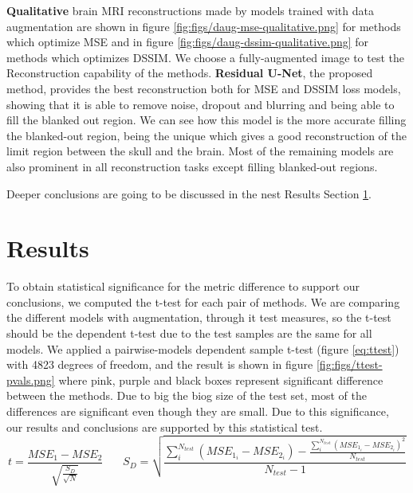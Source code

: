 \textbf{Qualitative} brain MRI reconstructions made by models trained with data augmentation are shown in figure \ref{fig:figs/daug-mse-qualitative.png} for methods which optimize MSE and in figure \ref{fig:figs/daug-dssim-qualitative.png} for methods which optimizes DSSIM. We choose a fully-augmented image to test the Reconstruction capability of the methods. \textbf{Residual U-Net}, the proposed method, provides the best reconstruction both for MSE and DSSIM loss models, showing that it is able to remove noise, dropout and blurring and being able to fill the blanked out region. We can see how this model is the more accurate filling the blanked-out region, being the unique which gives a good reconstruction of the limit region between the skull and the brain. Most of the remaining models are also prominent in all reconstruction tasks except filling blanked-out regions.



Deeper conclusions are going to be discussed in the nest Results Section \ref{section:results}.

\section{Results}
\label{section:results}

To obtain statistical significance for the metric difference to support our conclusions, we computed the t-test for each pair of methods. We are comparing the different models with augmentation, through it test measures, so the t-test should be the dependent t-test due to the test samples are the same for all models. We applied a pairwise-models dependent sample t-test (figure \ref{eq:ttest}) with 4823 degrees of freedom, and the result is shown in figure \ref{fig:figs/ttest-pvals.png} where pink, purple and black boxes represent significant difference between the methods. Due to big the biog size of the test set, most of the differences are significant even though they are small. Due to this significance, our results and conclusions are supported by this statistical test.
\begin{equation}
t = \frac{MSE_1 - MSE_2}{\sqrt{\frac{S_D}{\sqrt{N}}}}
\: \: \: \: \: \: \: \: 
S_D = \sqrt{\frac{\sum_i^{N_{test}}(MSE_{1_i}-MSE_{2_i}) - \frac{\sum_i^{N_{test}}(MSE_{1_i}-MSE_{2_i})^2}{N_{test}}}{N_{test}-1}}
\label{eq:ttest}
\end{equation}


